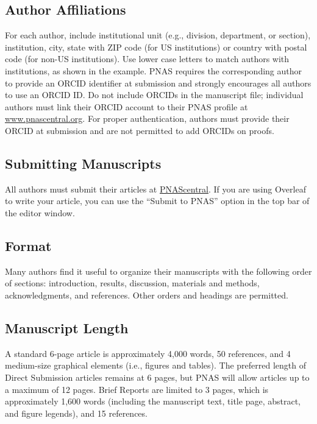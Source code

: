 \documentclass[9pt,twocolumn,twoside]{pnas-new}
\begin{document}
\subsection*{Author Affiliations}

For each author, include institutional unit (e.g., division, department, or section), institution, city, state with ZIP code (for US institutions) or country with postal code (for non-US institutions). Use lower case letters to match authors with institutions, as shown in the example. PNAS requires the corresponding author to provide an ORCID identifier at submission and strongly encourages all authors to use an ORCID ID. Do not include ORCIDs in the manuscript file; individual authors must link their ORCID account to their PNAS profile at \href{http://www.pnascentral.org/}{www.pnascentral.org}. For proper authentication, authors must provide their ORCID at submission and are not permitted to add ORCIDs on proofs.

\subsection*{Submitting Manuscripts}

All authors must submit their articles at \href{http://www.pnascentral.org/cgi-bin/main.plex}{PNAScentral}. If you are using Overleaf to write your article, you can use the ``Submit to PNAS'' option in the top bar of the editor window.

\subsection*{Format}

Many authors find it useful to organize their manuscripts with the following order of sections: introduction, results, discussion, materials and methods, acknowledgments, and references. Other orders and headings are permitted.

\subsection*{Manuscript Length}

A standard 6-page article is approximately 4,000 words, 50 references, and 4 medium-size graphical elements (i.e., figures and tables). The preferred length of Direct Submission articles remains at 6 pages, but PNAS will allow articles up to a maximum of 12 pages. Brief Reports are limited to 3 pages, which is approximately 1,600 words (including the manuscript text, title page, abstract, and figure legends), and 15 references.
\end{document}
